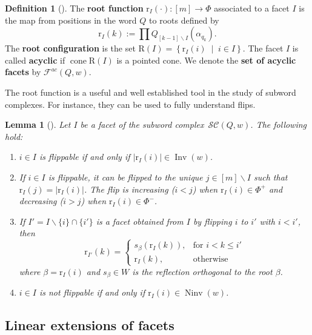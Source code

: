 \documentclass{amsart}
\newtheorem{lemma}[theorem]{Lemma}
\theoremstyle{definition}
\newtheorem{definition}[theorem]{Definition}
\newcommand{\set}[2]{\left\{ #1 \;\middle|\; #2 \right\}} %
\DeclareMathOperator{\cone}{cone} %
\DeclareMathOperator{\Inv}{Inv} %
\DeclareMathOperator{\Ninv}{Ninv} %
\newcommand{\defn}[1]{\textbf{\textsf{\color{PineGreen} #1}}} %
\newcommand{\subwordComplex}{\mathcal{SC}} %
\newcommand{\Roots}{\mathrm{R}} %
\newcommand{\rootFunction}[2]{\mathrm{r}_{#1}(#2)} %
\newcommand{\subwordAcyclicFacets}{\mathcal{F}^{ac}} %
\begin{document}
\begin{definition}[{\cite{CeballosLabbeStump}}]
    The \defn{root function} $\rootFunction{I}{\cdot}:[m]\rightarrow \Phi$ associated to a facet $I$ is the map from positions in the word $Q$ to roots defined by 
    \[
    \rootFunction{I}{k} := \prod Q_{[k-1]\smallsetminus I}(\alpha_{q_k}).
    \]
    The \defn{root configuration} is the set $\Roots(I)=\set{\rootFunction{I}{i}}{i\in I}$. 
    The facet $I$ is called \defn{acyclic} if $\cone \Roots(I)$ is a pointed cone. 
    We denote the \defn{set of acyclic facets} by $\subwordAcyclicFacets(Q,w)$. 
\end{definition}
The root function is a useful and well established tool in the study of subword complexes. For instance, they can be used to fully understand flips. 
\begin{lemma}[{\cite{CeballosLabbeStump,knutson_subword_2004}}]
\label{lem_rootfunction_flips}
Let $I$ be a facet of the subword complex~$\subwordComplex(Q,w)$. The following hold:
\begin{enumerate}
    \item $i \in I$ is flippable if and only if $|\rootFunction{I}{i}|\in \Inv(w)$.
    \item If $i \in I$ is flippable, it can be flipped to the unique $j\in [m]\smallsetminus I$ such that $\rootFunction{I}{j}=|\rootFunction{I}{i}|$. 
    The flip is increasing ($i<j$) when $\rootFunction{I}{i}\in \Phi^+$ and decreasing ($i>j$) when $\rootFunction{I}{i}\in \Phi^-$. \label{lem_rootfunction_flips2}
    \item If $I'=I\smallsetminus \{i\}\cap \{i'\}$ is a facet obtained from $I$ by flipping $i$ to $i'$ with $i<i'$, then
    \begin{equation}\label{eq_rootfunction_flip}
         \rootFunction{I'}{k} = 
  \begin{cases}
    s_\beta(\rootFunction{I}{k}), & \text{for } i < k \leq i' \\
    \rootFunction{I}{k}, & \text{otherwise}
  \end{cases}
    \end{equation}
    where $\beta=\rootFunction{I}{i}$ and $s_\beta\in W$ is the reflection orthogonal to the root $\beta$.
    \item $i \in I$ is not flippable if and only if $\rootFunction{I}{i}\in \Ninv(w)$.
\end{enumerate}
\end{lemma}

\subsection{Linear extensions of facets}
\end{document}
